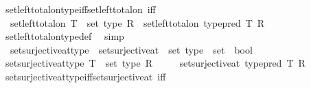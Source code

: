 \begin{isabellebody}
\isanewline
\isanewline
{}\isamarkupfalse%
\ set{\isacharunderscore}{\kern0pt}left{\isacharunderscore}{\kern0pt}total{\isacharunderscore}{\kern0pt}on{\isacharunderscore}{\kern0pt}type{\isacharunderscore}{\kern0pt}iff{\isacharunderscore}{\kern0pt}set{\isacharunderscore}{\kern0pt}left{\isacharunderscore}{\kern0pt}total{\isacharunderscore}{\kern0pt}on\ {\isacharbrackleft}{\kern0pt}iff{\isacharbrackright}{\kern0pt}{\isacharcolon}{\kern0pt}\isanewline
\ \ {\isachardoublequoteopen}set{\isacharunderscore}{\kern0pt}left{\isacharunderscore}{\kern0pt}total{\isacharunderscore}{\kern0pt}on\ {\isacharparenleft}{\kern0pt}T\ {\isacharcolon}{\kern0pt}{\isacharcolon}{\kern0pt}\ set\ type{\isacharparenright}{\kern0pt}\ R\ {\isasymlongleftrightarrow}\ set{\isacharunderscore}{\kern0pt}left{\isacharunderscore}{\kern0pt}total{\isacharunderscore}{\kern0pt}on\ {\isacharparenleft}{\kern0pt}type{\isacharunderscore}{\kern0pt}pred\ T{\isacharparenright}{\kern0pt}\ R{\isachardoublequoteclose}\isanewline
%
\isadelimproof
\ \ %
\endisadelimproof
%
\isatagproof
{}\isamarkupfalse%
\ set{\isacharunderscore}{\kern0pt}left{\isacharunderscore}{\kern0pt}total{\isacharunderscore}{\kern0pt}on{\isacharunderscore}{\kern0pt}type{\isacharunderscore}{\kern0pt}def\ \isamarkupfalse%
\ simp%
\endisatagproof
{\isafoldproof}%
%
\isadelimproof
\isanewline
%
\endisadelimproof
\isanewline
{}\isamarkupfalse%
\isanewline
\ \ set{\isacharunderscore}{\kern0pt}surjective{\isacharunderscore}{\kern0pt}at{\isacharunderscore}{\kern0pt}type\ {\isasymequiv}\ {\isachardoublequoteopen}set{\isacharunderscore}{\kern0pt}surjective{\isacharunderscore}{\kern0pt}at\ {\isacharcolon}{\kern0pt}{\isacharcolon}{\kern0pt}\ set\ type\ {\isasymRightarrow}\ set\ {\isasymRightarrow}\ bool{\isachardoublequoteclose}\isanewline
{}\isanewline
\ \ \isamarkupfalse%
\ {\isachardoublequoteopen}set{\isacharunderscore}{\kern0pt}surjective{\isacharunderscore}{\kern0pt}at{\isacharunderscore}{\kern0pt}type\ {\isacharparenleft}{\kern0pt}T\ {\isacharcolon}{\kern0pt}{\isacharcolon}{\kern0pt}\ set\ type{\isacharparenright}{\kern0pt}\ R\ {\isasymequiv}\isanewline
\ \ \ \ set{\isacharunderscore}{\kern0pt}surjective{\isacharunderscore}{\kern0pt}at\ {\isacharparenleft}{\kern0pt}type{\isacharunderscore}{\kern0pt}pred\ T{\isacharparenright}{\kern0pt}\ R{\isachardoublequoteclose}\isanewline
{}\isamarkupfalse%
\isanewline
\isanewline
{}\isamarkupfalse%
\ set{\isacharunderscore}{\kern0pt}surjective{\isacharunderscore}{\kern0pt}at{\isacharunderscore}{\kern0pt}type{\isacharunderscore}{\kern0pt}iff{\isacharunderscore}{\kern0pt}set{\isacharunderscore}{\kern0pt}surjective{\isacharunderscore}{\kern0pt}at\ {\isacharbrackleft}{\kern0pt}iff{\isacharbrackright}{\kern0pt}{\isacharcolon}{\kern0pt}\isanewline

\end{isabellebody}
